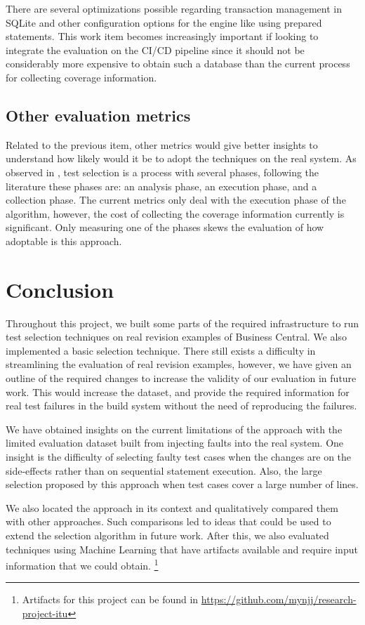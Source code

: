 \documentclass{article}
\begin{document}
There are several optimizations possible regarding transaction management in SQLite and other configuration options for the engine like using prepared statements. This work item becomes increasingly important if looking to integrate the evaluation on the CI/CD pipeline since it should not be considerably more expensive to obtain such a database than the current process for collecting coverage information.

\subsection{Other evaluation metrics}
Related to the previous item, other metrics would give better insights to understand how likely would it be to adopt the techniques on the real system. As observed in \cite{10.1109/ICSE.2019.00055}, test selection is a process with several phases, following the literature these phases are: an analysis phase, an execution phase, and a collection phase. The current metrics only deal with the execution phase of the algorithm, however, the cost of collecting the coverage information currently is significant. Only measuring one of the phases skews the evaluation of how adoptable is this approach.

\section{Conclusion}

Throughout this project, we built some parts of the required infrastructure to run test selection techniques on real revision examples of Business Central. We also implemented a basic selection technique. There still exists a difficulty in streamlining the evaluation of real revision examples, however, we have given an outline of the required changes to increase the validity of our evaluation in future work. This would increase the dataset, and provide the required information for real test failures in the build system without the need of reproducing the failures.

We have obtained insights on the current limitations of the approach with the limited evaluation dataset built from injecting faults into the real system. One insight is the difficulty of selecting faulty test cases when the changes are on the side-effects rather than on sequential statement execution. Also, the large selection proposed by this approach when test cases cover a large number of lines.

We also located the approach in its context and qualitatively compared them with other approaches. Such comparisons led to ideas that could be used to extend the selection algorithm in future work. After this, we also evaluated techniques using Machine Learning that have artifacts available and require input information that we could obtain. \footnote{Artifacts for this project can be found in \href{https://github.com/mynjj/research-project-itu}{https://github.com/mynjj/research-project-itu}}
\end{document}
